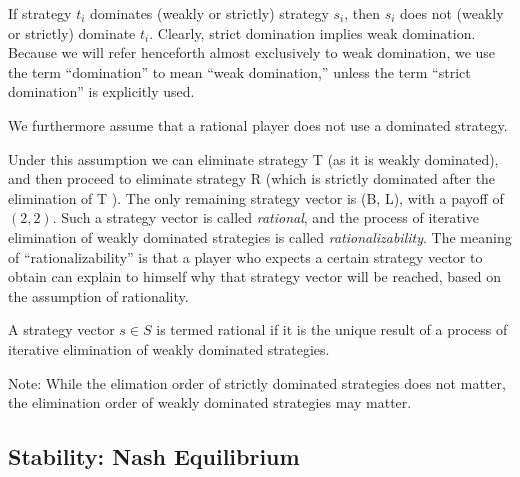 If strategy $t_i$ dominates (weakly or strictly) strategy $s_i$, then $s_i$ does not (weakly or strictly) dominate $t_i$. Clearly, strict domination implies weak domination. Because we will refer henceforth almost exclusively to weak domination, we use the term “domination” to mean “weak domination,” unless the term “strict domination” is explicitly used.

We furthermore assume that a rational player does not use a dominated strategy.

Under this assumption we can eliminate strategy T (as it is weakly dominated), and then proceed to eliminate strategy R (which
is strictly dominated after the elimination of T ). The only remaining strategy vector is (B, L), with a payoff of $(2, 2)$. Such a strategy vector is called \emph{rational}, and the process of iterative elimination of weakly dominated strategies is called \emph{rationalizability}. The meaning of “rationalizability” is that a player who expects a certain strategy vector to obtain can explain to himself why that strategy vector will be reached, based on the assumption of rationality.

\begin{definition}
A strategy vector $s \in S$ is termed rational if it is the unique result of a process of iterative elimination of weakly dominated strategies.
\end{definition}


Note: While the elimation order of strictly dominated strategies does not matter, the elimination order of weakly dominated strategies may matter.




\subsection{Stability: Nash Equilibrium}




